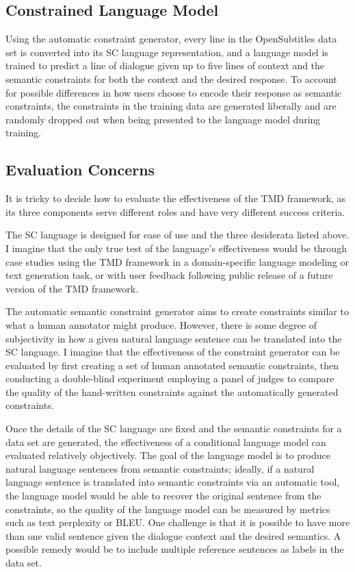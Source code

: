 \documentclass{article}
\numberwithin{equation}{section}
\begin{document}
\subsection{Constrained Language Model}

Using the automatic constraint generator, every line in the OpenSubtitles data set is converted into its SC language representation, and a language model is trained to predict a line of dialogue given up to five lines of context and the semantic constraints for both the context and the desired response. To account for possible differences in how users choose to encode their response as semantic constraints, the constraints in the training data are generated liberally and are randomly dropped out when being presented to the language model during training.

\subsection{Evaluation Concerns}

It is tricky to decide how to evaluate the effectiveness of the TMD framework, as its three components serve different roles and have very different success criteria.

The SC language is designed for ease of use and the three desiderata listed above. I imagine that the only true test of the language's effectiveness would be through case studies using the TMD framework in a domain-specific language modeling or text generation task, or with user feedback following public release of a future version of the TMD framework.

The automatic semantic constraint generator aims to create constraints similar to what a human annotator might produce. However, there is some degree of subjectivity in how a given natural language sentence can be translated into the SC language. I imagine that the effectiveness of the constraint generator can be evaluated by first creating a set of human annotated semantic constraints, then conducting a double-blind experiment employing a panel of judges to compare the quality of the hand-written constraints against the automatically generated constraints.

Once the details of the SC language are fixed and the semantic constraints for a data set are generated, the effectiveness of a conditional language model can evaluated relatively objectively. The goal of the language model is to produce natural language sentences from semantic constraints; ideally, if a natural language sentence is translated into semantic constraints via an automatic tool, the language model would be able to recover the original sentence from the constraints, so the quality of the language model can be measured by metrics such as text perplexity or BLEU. One challenge is that it is possible to have more than one valid sentence given the dialogue context and the desired semantics. A possible remedy would be to include multiple reference sentences as labels in the data set.
\end{document}

